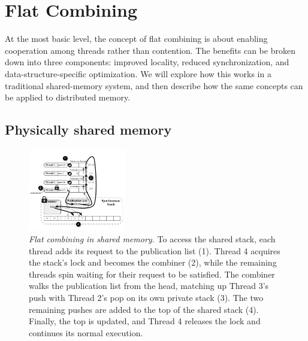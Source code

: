 \section{Flat Combining}

At the most basic level, the concept of flat combining is about enabling cooperation among threads rather than contention. The benefits can be broken down into three components: improved locality, reduced synchronization, and data-structure-specific optimization. We will explore how this works in a traditional shared-memory system, and then describe how the same concepts can be applied to distributed memory.


\subsection{Physically shared memory}

\begin{figure}[t]
  \centering
  \includegraphics[width=0.38\textwidth]{figs/fc_shared_mem.pdf}
  \caption{\emph{Flat combining in shared memory.}
    To access the shared stack, each thread adds its request to the publication list (1). Thread 4 acquires the stack's lock and becomes the combiner (2), while the remaining threads spin waiting for their request to be satisfied. The combiner walks the publication list from the head, matching up Thread 3's push with Thread 2's pop on its own private stack (3). The two remaining pushes are added to the top of the shared stack (4). Finally, the top is updated, and Thread 4 releases the lock and continues its normal execution.
  }
  \label{fig:fc_shared_mem}
\end{figure}


